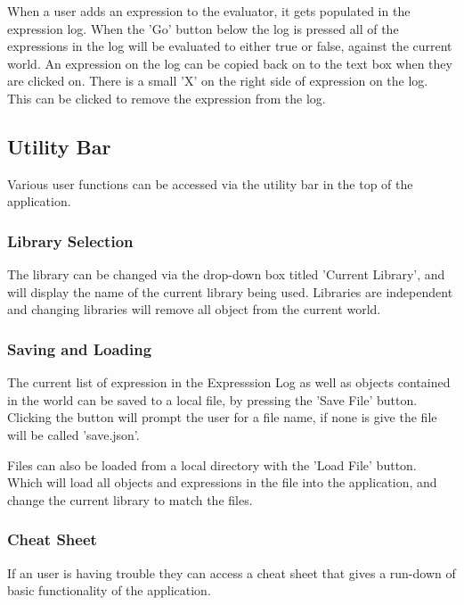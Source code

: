 \documentclass{article}
\begin{document}
	When a user adds an expression to the evaluator, it gets populated in the expression log. When the 'Go' button below the log is pressed all of the expressions in the log will be evaluated to either true or false, against the current world. An expression on the log can be copied back on to the text box when they are clicked on. There is a small 'X' on the right side of expression on the log. This can be clicked to remove the expression from the log. 
	
	\subsection{Utility Bar}
	
	Various user functions can be accessed via the utility bar in the top of the application. 
	
	\subsubsection{Library Selection}
	
	The library can be changed via the drop-down box titled 'Current Library', and will display the name of the current library being used. Libraries are independent and changing libraries will remove all object from the current world.
	
	\subsubsection{Saving and Loading}
	The current list of expression in the Expresssion Log as well as objects contained in the world can be saved to a local file, by pressing the 'Save File' button. Clicking the button will prompt the user for a file name, if none is give the file will be called 'save.json'.
	
	Files can also be loaded from a local directory with the 'Load File' button. Which will load all objects and expressions in the file into the application, and change the current library to match the files.
	
	\subsubsection{Cheat Sheet}
	If an user is having trouble they can access a cheat sheet that gives a run-down of basic functionality of the application.
	
	
	
\end{document}
